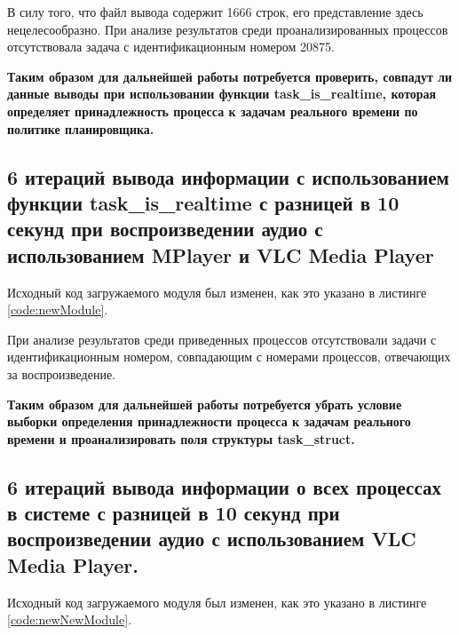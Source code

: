 В силу того, что файл вывода содержит 1666 строк, его представление здесь нецелесообразно. При анализе результатов среди проанализированных процессов отсутствовала задача с идентификационным номером 20875.

\textbf{Таким образом для дальнейшей работы потребуется проверить, совпадут ли данные выводы при использовании функции task\_is\_realtime, которая определяет принадлежность процесса к задачам реального времени по политике планировщика.}

\subsection{6 итераций вывода информации с использованием функции task\_is\_realtime с разницей в 10 секунд при воспроизведении аудио с использованием MPlayer и VLC Media Player}
Исходный код загружаемого модуля был изменен, как это указано в листинге \ref{code:newModule}.


При анализе результатов среди приведенных процессов отсутствовали задачи с идентификационным номером, совпадающим с номерами процессов, отвечающих за воспроизведение.

\textbf{Таким образом для дальнейшей работы потребуется убрать условие выборки определения принадлежности процесса к задачам реального времени и проанализировать поля структуры task\_struct. }

\subsection{6 итераций вывода информации о всех процессах в системе с разницей в 10 секунд при воспроизведении аудио с использованием VLC Media Player. }
Исходный код загружаемого модуля был изменен, как это указано в листинге \ref{code:newNewModule}.


